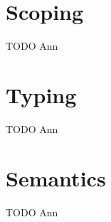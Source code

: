 \section{Scoping}
\label{sec:scoping}

TODO Ann

\section{Typing}
\label{sec:typing}

TODO Ann

\section{Semantics}
\label{sec:semantics}

TODO Ann

